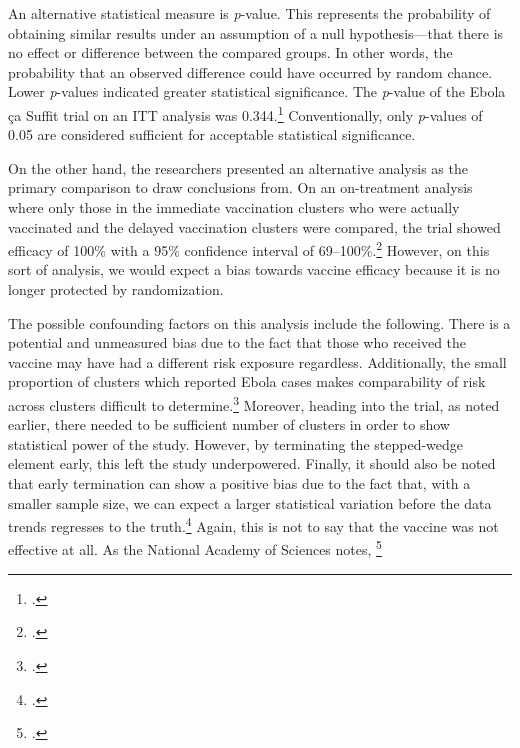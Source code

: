 \documentclass[letterpaper,notitlepage,12pt]{article}
\begin{document}
An alternative statistical measure is \textit{p}-value.
This represents the probability of obtaining similar results under an assumption
of a null hypothesis---that there is no effect or difference between the
compared groups.
In other words, the probability that an observed difference could have occurred
by random chance.
Lower \textit{p}-values indicated greater statistical significance.
The \textit{p}-value of the Ebola \c{c}a Suffit trial on an ITT analysis was
0.344.\footcite{HR2016}
Conventionally, only \textit{p}-values of 0.05 are considered sufficient for
acceptable statistical significance.

On the other hand, the researchers presented an alternative analysis as the
primary comparison to draw conclusions from.
On an on-treatment analysis where only those in the immediate vaccination
clusters who were actually vaccinated and the delayed vaccination clusters were
compared, the
trial showed efficacy of 100\% with a 95\% confidence interval of
69--100\%.\footcite{HR2016}
However, on this sort of analysis, we would expect a bias towards vaccine
efficacy because it is no longer protected by randomization.

The possible confounding factors on this analysis include the following.
There is a potential and unmeasured bias due to the fact that those who received
the vaccine may have had a different risk exposure regardless. 
Additionally, the small
proportion of clusters which reported Ebola cases makes comparability of risk
across clusters difficult to determine.\footcite[p. 129]{NAP}
Moreover, heading into the trial, as noted earlier, there needed to be
sufficient number of clusters in order to show statistical power of the study.
However, by terminating the stepped-wedge element early, this left the study
underpowered.
Finally, it should also be noted that early termination can show a
positive bias due to the fact that, with a smaller sample size, we can expect a
larger statistical variation before the data trends regresses to the 
truth.\footcite{handbook}
Again, this is not to say that the vaccine was not effective at all.
As the National Academy of Sciences notes, \footcite[p.
128]{NAP}
\end{document}
